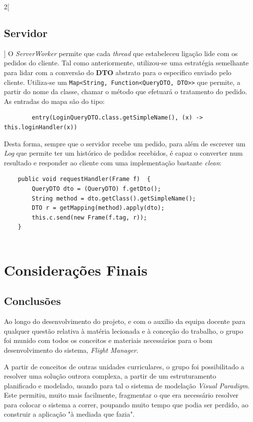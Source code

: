 \documentclass[a4paper,11pt]{scrreprt}
\begin{document}
\begin{multicols}{2}[\section{Servidor}]
    O \textit{ServerWorker} permite que cada \textit{thread} que estabeleceu ligação
    lide com os pedidos do cliente.
    Tal como anteriormente, utilizou-se uma estratégia semelhante para lidar com a conversão
    do \textbf{DTO} abstrato para o especifico enviado pelo cliente.
    Utiliza-se um \texttt{Map<String, Function<QueryDTO, DTO>>} que permite,
    a partir do nome da classe, chamar o método que efetuará o tratamento do pedido.
    As entradas do mapa são do tipo:
    \begin{verbatim}
        entry(LoginQueryDTO.class.getSimpleName(), (x) -> this.loginHandler(x))
    \end{verbatim}
    Desta forma, sempre que o servidor recebe um pedido, para além de escrever um
    \textit{Log} que permite ter um histórico de pedidos recebidos, é capaz o converter
    num resultado e responder ao cliente com uma implementação bastante \textit{clean}:
    \begin{verbatim}
	public void requestHandler(Frame f)  {
		QueryDTO dto = (QueryDTO) f.getDto();
		String method = dto.getClass().getSimpleName();
		DTO r = getMapping(method).apply(dto);
		this.c.send(new Frame(f.tag, r));
	}
        
    \end{verbatim}
\end{multicols}

\chapter{Considerações Finais}
\section{Conclusões}

Ao longo do desenvolvimento do projeto, e com o auxilio da equipa docente para qualquer questão 
relativa à matéria lecionada e à conceção do trabalho, o grupo foi munido com todos os conceitos
e materiais necessários para o bom desenvolvimento do sistema, \textit{Flight Manager}.

A partir de conceitos de outras unidades curriculares, o grupo foi possibilitado a resolver uma 
solução outrora complexa, a partir de um estruturamento planificado e modelado, usando para tal 
o sistema de modelação \textit{Visual Paradigm}.
Este permitiu, muito mais facilmente, fragmentar o que era necessário resolver para colocar o 
sistema a correr, poupando muito tempo que podia ser perdido, ao construir a aplicação "à mediada
que fazia".
\end{document}
